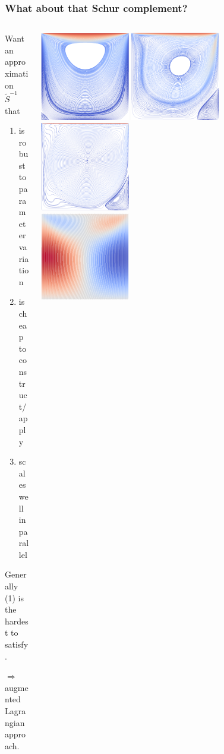 \documentclass[presentation,aspectratio=43, 10pt]{beamer}
\begin{document}
\begin{frame}
  \frametitle{What about that Schur complement?}
  \begin{columns}
    \begin{column}{0.55\textwidth}
      Want an approximation $\tilde{S}^{-1}$ that
      \begin{enumerate}
      \item is robust to parameter variation
      \item is cheap to construct/apply
      \item scales well in parallel
      \end{enumerate}

      Generally (1) is the hardest to satisfy.

      $\Rightarrow$ augmented Lagrangian approach.
    \end{column}
    \begin{column}{0.45\textwidth}
      \includegraphics[width=0.333\textwidth]{mhd/ldc_1_1_u}%
      \includegraphics[width=0.333\textwidth]{mhd/ldc_500_500_u}%
      \includegraphics[width=0.333\textwidth]{mhd/ldc_5000_5000_u}%
      \\
      \includegraphics[width=0.333\textwidth]{mhd/ldc_1_1_B}%

\end{column}
\end{columns}
\end{frame}
\end{document}
